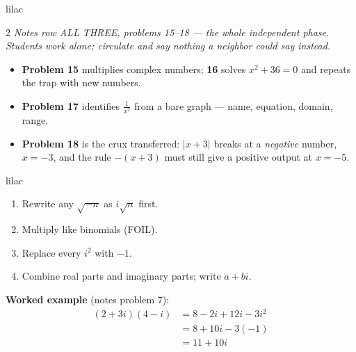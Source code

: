 \documentclass[10pt]{article}
\begin{document}
\begin{skillbox}{lilac}
\begin{multicols}{2}
\textit{Notes row ALL THREE, problems 15--18 --- the whole independent phase. Students work
alone; circulate and say nothing a neighbor could say instead.}
\begin{itemize}
  \item \textbf{Problem 15} multiplies complex numbers; \textbf{16} solves $x^2 + 36 = 0$ and
        repeats the trap with new numbers.
  \item \textbf{Problem 17} identifies $\frac{1}{x^2}$ from a bare graph --- name, equation,
        domain, range.
  \item \textbf{Problem 18} is the crux transferred: $|x + 3|$ breaks at a \textit{negative}
        number, $x = -3$, and the rule $-(x + 3)$ must still give a positive output at
        $x = -5$.
\end{itemize}
\end{multicols}
\end{skillbox}

\begin{skillbox}{lilac}
\begin{minipage}[t]{0.48\linewidth}
\begin{enumerate}[itemsep=2pt]
  \item Rewrite any $\sqrt{-n}$ as $i\sqrt{n}$ first.
  \item Multiply like binomials (FOIL).
  \item Replace every $i^2$ with $-1$.
  \item Combine real parts and imaginary parts; write $a + bi$.
\end{enumerate}
\end{minipage}\hfill
\begin{minipage}[t]{0.48\linewidth}
\textbf{Worked example} (notes problem 7):
\begin{align*}
(2 + 3i)(4 - i) &= 8 - 2i + 12i - 3i^2 \\
                &= 8 + 10i - 3(-1) \\
                &= 11 + 10i
\end{align*}
\end{minipage}
\end{skillbox}
\end{document}
